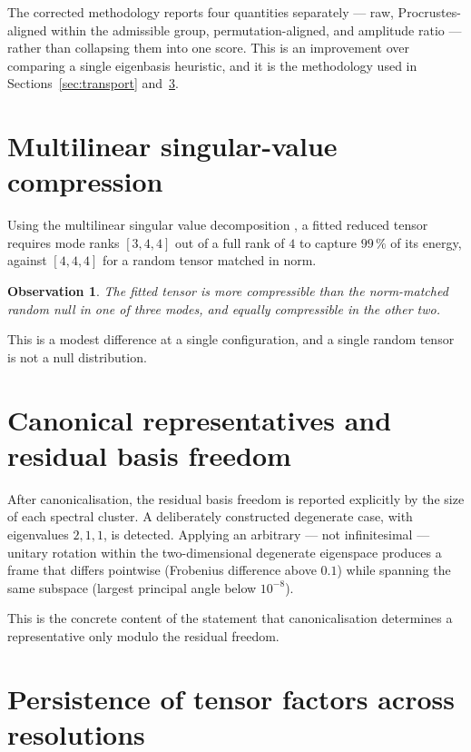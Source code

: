 \documentclass[11pt]{amsart}
\newtheorem{observation}{Observation}[section]
\theoremstyle{remark}
\begin{document}
The corrected methodology reports four quantities separately --- raw, Procrustes-aligned
within the admissible group, permutation-aligned, and amplitude ratio --- rather than
collapsing them into one score. This is an improvement over comparing a single eigenbasis
heuristic, and it is the methodology used in Sections~\ref{sec:transport}
and~\ref{sec:persistence}.

\section{Multilinear singular-value compression}
\label{sec:hosvd}

Using the multilinear singular value decomposition \cite{DeLathauwerEtAl2000}, a fitted
reduced tensor requires mode ranks $[3,4,4]$ out of a full rank of $4$ to capture $99\,\%$
of its energy, against $[4,4,4]$ for a random tensor matched in norm.

\begin{observation}
\label{obs:hosvd}
The fitted tensor is more compressible than the norm-matched random null in one of three
modes, and equally compressible in the other two.
\end{observation}

This is a modest difference at a single configuration, and a single random tensor is not a
null distribution.

\section{Canonical representatives and residual basis freedom}
\label{sec:canonical}

After canonicalisation, the residual basis freedom is reported explicitly by the size of
each spectral cluster. A deliberately constructed degenerate case, with eigenvalues
$2,1,1$, is detected. Applying an arbitrary --- not infinitesimal --- unitary rotation
within the two-dimensional degenerate eigenspace produces a frame that differs pointwise
(Frobenius difference above $0.1$) while spanning the same subspace (largest principal angle
below $10^{-8}$).

This is the concrete content of the statement that canonicalisation determines a
representative only modulo the residual freedom.

\section{Persistence of tensor factors across resolutions}
\label{sec:persistence}
\end{document}
